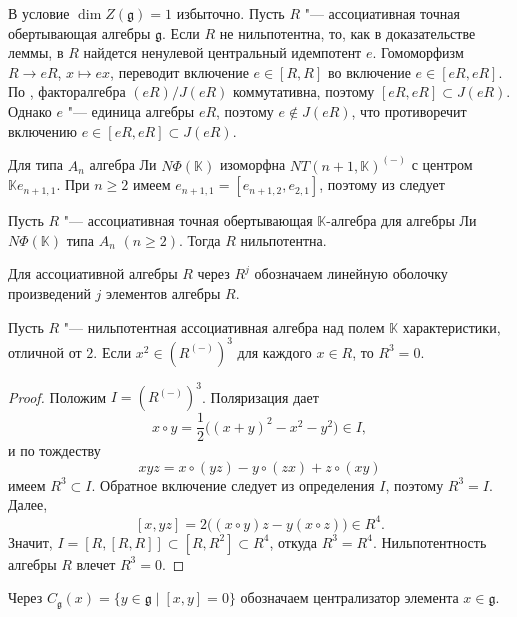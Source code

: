 \documentclass[a4paper,14pt,oneside,openany]{memoir}
\begin{document}
\begin{remark}\label{remark:assoc-envelope-center}
    В  условие $\dim Z(\mathfrak{g})=1$
    избыточно. Пусть $R$ "--- ассоциативная точная обертывающая алгебры
    $\mathfrak{g}$. Если $R$ не нильпотентна, то, как в доказательстве леммы, в $R$
    найдется ненулевой центральный идемпотент $e$. Гомоморфизм $R\to eR$, $x\mapsto
    ex$, переводит включение $e\in[R,R]$ во включение $e\in[eR,eR]$. По
    , факторалгебра $(eR)/J(eR)$
    коммутативна, поэтому $[eR,eR]\subset J(eR)$. Однако $e$ "--- единица алгебры
    $eR$, поэтому $e\notin J(eR)$, что противоречит включению $e\in[eR,eR]\subset
    J(eR)$.
\end{remark}

Для типа $A_n$ алгебра Ли $N\Phi(\mathbb{K})$ изоморфна
$NT(n+1,\mathbb{K})^{(-)}$ с центром $\mathbb{K}e_{n+1,1}$. При $n\ge2$ имеем
$e_{n+1,1}=[e_{n+1,2},e_{2,1}]$, поэтому из
 следует

\begin{corollary}\label{corollary:assoc-envelope-nilpotent-An}
    Пусть $R$ "--- ассоциативная точная обертывающая $\mathbb{K}$-алгебра для
    алгебры Ли $N\Phi(\mathbb{K})$ типа $A_n$ $(n \ge 2)$. Тогда $R$ нильпотентна.
\end{corollary}

Для ассоциативной алгебры $R$ через $R^j$ обозначаем линейную оболочку
произведений $j$ элементов алгебры $R$.

\begin{lemma}\label{l:assoc-squares-third}
    Пусть $R$ "--- нильпотентная ассоциативная алгебра над полем $\mathbb{K}$
    характеристики, отличной от $2$. Если $x^2\in(R^{(-)})^3$ для каждого $x\in R$,
    то $R^3=0$.
\end{lemma}
\begin{proof}
    Положим $I=(R^{(-)})^3$. Поляризация \cite[п.~2.3.9]{linalg1986} дает
    \[
        x\circ y=\frac12\bigl((x+y)^2-x^2-y^2\bigr)\in I,
    \]
    и по тождеству
    \[
        xyz=x\circ(yz)-y\circ(zx)+z\circ(xy)
    \]
    имеем $R^3\subset I$. Обратное включение следует из определения $I$, поэтому
    $R^3=I$. Далее,
    \[
        [x,yz]=2\bigl((x\circ y)z-y(x\circ z)\bigr)\in R^4.
    \]
    Значит, $I=[R,[R,R]]\subset[R,R^2]\subset R^4$, откуда $R^3=R^4$.
    Нильпотентность алгебры $R$ влечет $R^3=0$.
\end{proof}

Через $C_{\mathfrak{g}}(x)=\{y\in\mathfrak{g}\mid[x,y]=0\}$ обозначаем
централизатор элемента $x\in\mathfrak{g}$.
\end{document}
